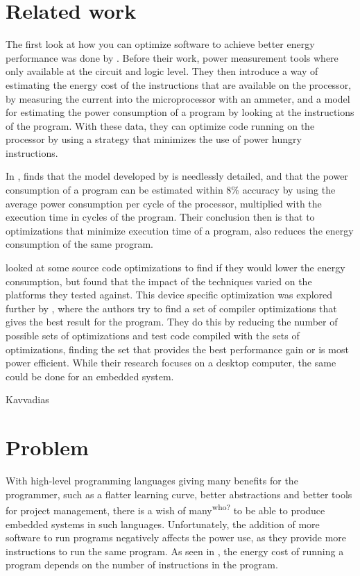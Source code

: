 \section{Related work}
The first look at how you can optimize software to achieve better energy performance was done by \cite{tiwari94}.
Before their work, power measurement tools where only available at the circuit and logic level.
They then introduce a way of estimating the energy cost of the instructions that are available on the processor, by measuring the current into the microprocessor with an ammeter, and a model for estimating the power consumption of a program by looking at the instructions of the program.
With these data, they can optimize code running on the processor by using a strategy that minimizes the use of power hungry instructions.

In \cite{russell98}, finds that the model developed by \cite{tiwari94} is needlessly detailed, and that the power consumption of a program can be estimated within 8\% accuracy by using the average power consumption per cycle of the processor, multiplied with the execution time in cycles of the program.
Their conclusion then is that to optimizations that minimize execution time of a program, also reduces the energy consumption of the same program.

\cite{ortiz08} looked at some source code optimizations to find if they would lower the energy consumption, but found that the impact of the techniques varied on the platforms they tested against.
This device specific optimization was explored further by \cite{delima13}, where the authors try to find a set of compiler optimizations that gives the best result for the program.
They do this by reducing the number of possible sets of optimizations and test code compiled with the sets of optimizations, finding the set that provides the best performance gain or is most power efficient.
While their research focuses on a desktop computer, the same could be done for an embedded system.

Kavvadias

\section{Problem}
With high-level programming languages giving many benefits for the programmer, such as a flatter learning curve, better abstractions and better tools for project management, there is a wish of many\textsuperscript{who?} to be able to produce embedded systems in such languages.
Unfortunately, the addition of more software to run programs negatively affects the power use, as they provide more instructions to run the same program.
As seen in \cite{kavvadias04}, the energy cost of running a program depends on the number of instructions in the program.


